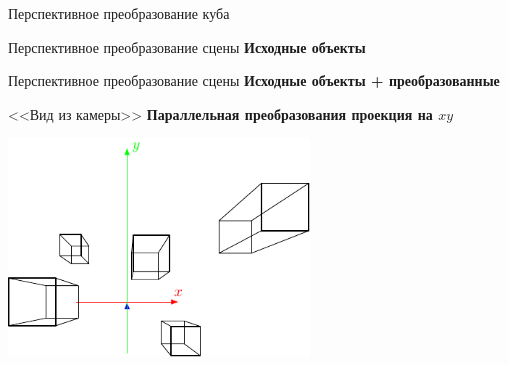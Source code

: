 \documentclass[10pt]{beamer}
\begin{document}
	


\begin{frame}[t]{Перспективное преобразование куба}
		\centering

		
\end{frame}


	
\begin{frame}{Перспективное преобразование сцены}	  
	\centering
	\textbf{Исходные объекты}
	
\end{frame}

\begin{frame}{Перспективное преобразование сцены}	  
	\centering
	\textbf{Исходные объекты + преобразованные}
	
\end{frame}




\begin{frame}{<<Вид из камеры>>}	  
	\centering
	\textbf{Параллельная преобразования проекция на $xy$}
	
	\includegraphics[page=1, width=0.6\textwidth]{cube projective true multiple xy.pdf} 
\end{frame}
\end{document}
